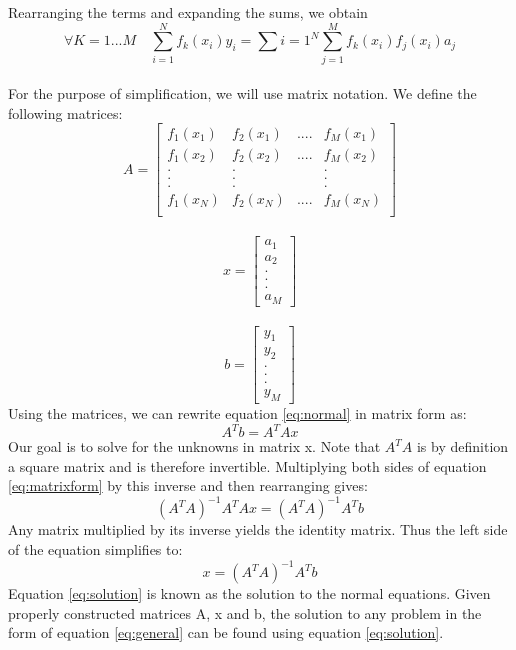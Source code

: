\documentclass[12pt]{article}
\begin{document}
Rearranging the terms and expanding the sums, we obtain 
\begin{equation}
\forall K = 1...M \quad  \sum_{i=1}^N f_k(x_i)y_i = \sum{i = 1}^N \sum_{j = 1}^M f_k (x_i) f_j(x_i)a_j
\label{eq:normal}
\end{equation}\\
For the purpose of simplification, we will use matrix notation. We define the following matrices:
\begin{equation}
A = 
	\begin{bmatrix}
		f_1(x_1) & f_2(x_1) &....&f_M(x_1) \\ 
		f_1(x_2) & f_2(x_2) &....&f_M(x_2) \\
		. & .  & & . \\
		. & .  & & . \\
		. & .  & & . \\		
		f_1(x_N) & f_2(x_N) &....&f_M(x_N) \\	
	\end{bmatrix}
\label{eq:matA}
\end{equation}
\\
\begin{equation}
x = 
	\begin{bmatrix}
		a_1 \\
		a_2 \\
		. \\
		. \\
		. \\
		a_M
	\end{bmatrix}
\label{eq:matx}
\end{equation}
\\
\begin{equation}
b = 
	\begin{bmatrix}
		y_1 \\
		y_2 \\
		. \\
		. \\
		. \\
		y_M
	\end{bmatrix}
\label{eq:matb}
\end{equation}
Using the matrices, we can rewrite equation \ref{eq:normal} in matrix form as:
\begin{equation}
A^Tb = A^TAx
\label{eq:matrixform}
\end{equation}
Our goal is to solve for the unknowns in matrix x.  Note that $A^TA$ is by definition a square matrix and is therefore invertible. Multiplying both sides of equation \ref{eq:matrixform} by this inverse and then rearranging gives:
\begin{equation}
(A^T A)^{-1} A^T Ax = (A^T A)^{-1}A^Tb
\end{equation}
Any matrix multiplied by its inverse yields the identity matrix. Thus the left side of the equation simplifies to:
\begin{equation}
x = (A^T A)^{-1} A^T b
\label{eq:solution}
\end{equation}
Equation \ref{eq:solution} is known as the solution to the normal equations. Given properly constructed matrices A, x and b, the solution to any problem in the form of equation \ref{eq:general} can be found using equation \ref{eq:solution}.
\end{document}
